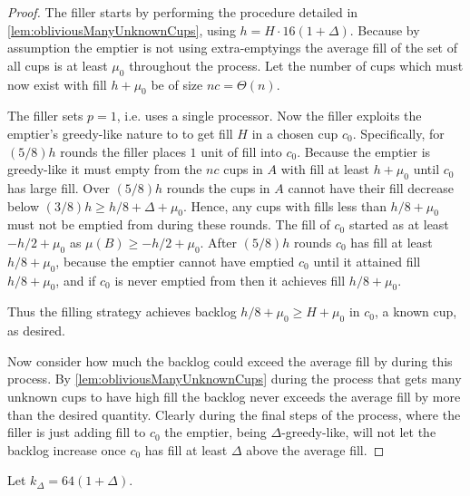 \begin{proof}
  The filler starts by performing the procedure detailed in
  \cref{lem:obliviousManyUnknownCups}, using $h = H\cdot
  16(1+\Delta)$. Because by assumption the emptier is not using
  extra-emptyings the average fill of the set of all cups is at
  least $\mu_0$ throughout the process.
  Let the number of cups which must now exist with
  fill $h+\mu_0$ be of size $nc = \Theta(n)$.

  The filler sets $p=1$, i.e. uses a single processor. Now the
  filler exploits the emptier's greedy-like nature to to get fill
  $H$ in a chosen cup $c_0$. Specifically, for $(5/8)h$ rounds
  the filler places $1$ unit of fill into $c_0$. Because the
  emptier is greedy-like it must empty from the $nc$ cups in $A$
  with fill at least $h+\mu_0$ until $c_0$ has large fill. Over
  $(5/8)h$ rounds the cups in $A$ cannot have their fill decrease
  below $(3/8)h \ge h/8 + \Delta + \mu_0$. Hence, any cups with fills
  less than $h/8+\mu_0$ must not be emptied from during these rounds.
  The fill of $c_0$ started as at least $-h/2+\mu_0$ as $\mu(B) \ge
  -h/2+\mu_0$. After $(5/8)h$ rounds $c_0$ has fill at least
  $h/8+\mu_0$,
  because the emptier cannot have emptied $c_0$ until it attained
  fill $h/8+\mu_0$, and if $c_0$ is never emptied from then it achieves
  fill $h/8+\mu_0$.

  Thus the filling strategy achieves backlog $h/8 +\mu_0 \ge H +
  \mu_0$ in $c_0$, a known cup, as desired.

  Now consider how much the backlog could exceed the average fill
  by during this process. By \cref{lem:obliviousManyUnknownCups}
  during the process that gets many unknown cups to have high
  fill the backlog never exceeds the average fill by more than
  the desired quantity. Clearly during the final steps of the
  process, where the filler is just adding fill to $c_0$ the
  emptier, being $\Delta$-greedy-like, will not let the backlog
  increase once $c_0$ has fill at least $\Delta$ above the
  average fill.

\end{proof}
Let $k_\Delta = 64(1+\Delta)$.

